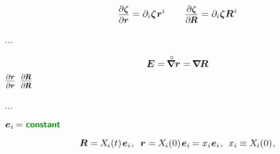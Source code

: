 \[
\scalebox{0.9}{$ \displaystyle \frac{\raisemath{-0.2em}{\partial \bm{\zeta}}}{\partial \bm{r}} $} = \partial_i \bm{\zeta} \hspace{.1ex} \bm{r}^i
\hspace{2em}
\scalebox{0.9}{$ \displaystyle \frac{\raisemath{-0.2em}{\partial \bm{\zeta}}}{\partial \hspace{-0.15ex} \bm{R}} $} = \partial_i \bm{\zeta} \bm{R}^{\hspace{.1ex}i}
\]



...

\nopagebreak\vspace{-0.2em}\begin{equation*}
\bm{E}
= \tikzmark{unitTensorAsOriginalDerivativeBegin} \hspace{-0.25ex} \boldnablacircled \bm{r} \tikzmark{unitTensorAsOriginalDerivativeEnd}
= \tikzmark{unitTensorAsCurrentDerivativeBegin} \hspace{-0.25ex} \boldnabla \hspace{-0.16ex} \bm{R} \tikzmark{unitTensorAsCurrentDerivativeEnd}
\end{equation*}%
%
{${ \scalebox{0.8}{$ \displaystyle \frac{\raisemath{-0.2em}{\partial \bm{r}}}{\partial \bm{r}} $} }$}%
%
{${ \scalebox{0.8}{$ \displaystyle \frac{\raisemath{-0.2em}{\partial \hspace{-0.15ex} \bm{R}}}{\partial \hspace{-0.15ex} \bm{R}} $} }$}

...

  ${\bm{e}_i \hspace{-0.16ex} = \boldconstant}$

\nopagebreak\vspace{-0.2em}\begin{equation*}
\bm{R} = \hspace{-0.15ex} X_{\hspace{-0.1ex}i}(t) \hspace{.2ex} \bm{e}_i
\hspace{.1ex} , \:\;
\bm{r} = \hspace{-0.15ex} X_{\hspace{-0.1ex}i}(0) \hspace{.2ex} \bm{e}_i \hspace{-0.16ex} = x_i \hspace{.1ex} \bm{e}_i
\hspace{.1ex} , \:\:
x_i \hspace{-0.1ex} \equiv \hspace{-0.1ex} X_{\hspace{-0.1ex}i}(0)
\hspace{.1ex} ,
\end{equation*}

